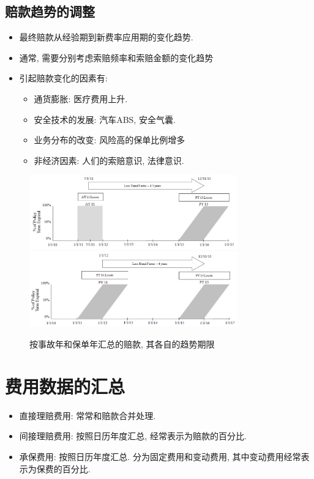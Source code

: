 \documentclass[professionalfont]{beamer}
\begin{document}
\subsection{赔款趋势的调整}
\begin{frame}
\begin{itemize}
	\item 最终赔款从经验期到新费率应用期的变化趋势.
	\item 通常, 需要分别考虑索赔频率和索赔金额的变化趋势
	\item 引起赔款变化的因素有:
	\begin{itemize}
		\item 通货膨胀: 医疗费用上升.
		\item 安全技术的发展: 汽车ABS, 安全气囊.
		\item 业务分布的改变: 风险高的保单比例增多
		\item 非经济因素: 人们的索赔意识, 法律意识.
	\end{itemize}
\end{itemize}
\end{frame}
\begin{frame}
	\begin{figure}
		\includegraphics[width=0.8\textwidth]{Plots/Loss_trend_1.jpg}\\
		\includegraphics[width=0.8\textwidth]{Plots/Loss_trend_2.jpg}
		\caption{按事故年和保单年汇总的赔款, 其各自的趋势期限}
	\end{figure}
\end{frame}
\section{费用数据的汇总}
\begin{frame}
	\begin{itemize}
		\item 直接理赔费用: 常常和赔款合并处理.
		\item 间接理赔费用: 按照日历年度汇总, 经常表示为赔款的百分比.
		\item 承保费用: 按照日历年度汇总. 分为固定费用和变动费用, 其中变动费用经常表示为保费的百分比.
	\end{itemize}
\end{frame}
\end{document}
